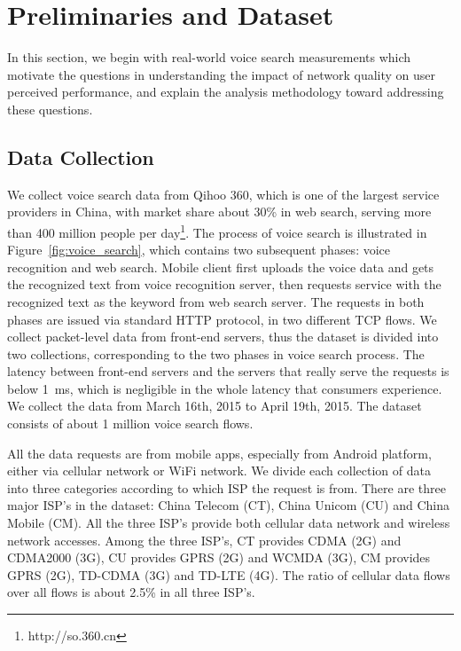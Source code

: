 
\section{Preliminaries and Dataset}
\label{sec:dataset}

In this section, we begin with real-world voice search measurements which motivate the questions in understanding the impact of network quality on user perceived performance, and explain the analysis methodology toward addressing these questions.

\subsection{Data Collection}

We collect voice search data from Qihoo 360, which is one of the largest service providers in China, with market share about 30\% in web search, serving more than 400 million people per day\footnote{http://so.360.cn}. The process of voice search is illustrated in Figure~\ref{fig:voice_search}, which contains two subsequent phases: voice recognition and web search. Mobile client first uploads the voice data and gets the recognized text from voice recognition server, then requests service with the recognized text as the keyword from web search server. The requests in both phases are issued via standard HTTP protocol, in two different TCP flows. We collect packet-level data from front-end servers, thus the dataset is divided into two collections, corresponding to the two phases in voice search process. The latency between front-end servers and the servers that really serve the requests is below 1~ms, which is negligible in the whole latency that consumers experience. We collect the data from March 16th, 2015 to April 19th, 2015. The dataset consists of about 1 million voice search flows.

All the data requests are from mobile apps, especially from Android platform, either via cellular network or WiFi network. We divide each collection of data into three categories according to which ISP the request is from. There are three major ISP's in the dataset: China Telecom (CT), China Unicom (CU) and China Mobile (CM). All the three ISP's provide both cellular data network and wireless network accesses. Among the three ISP's, CT provides CDMA (2G) and CDMA2000 (3G), CU provides GPRS (2G) and WCMDA (3G), CM provides GPRS (2G), TD-CDMA (3G) and TD-LTE (4G). The ratio of cellular data flows over all flows is about 2.5\% in all three ISP's.

